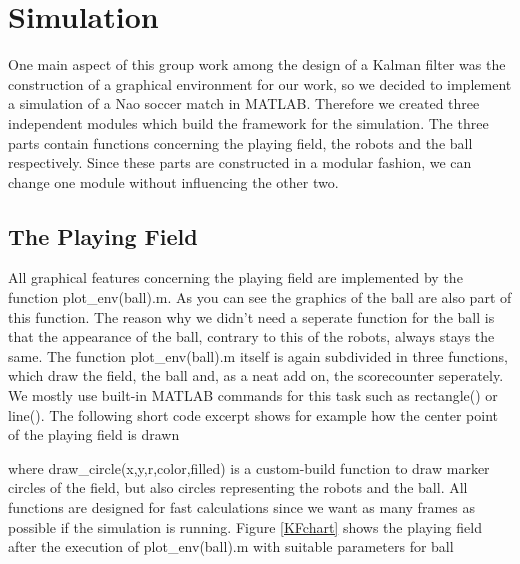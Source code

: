 
\chapter{Simulation}

One main aspect of this group work among the design of a Kalman filter was the construction of a graphical environment for our work, so we decided to implement a simulation of a Nao soccer match in MATLAB. Therefore we created three independent modules which build the framework for the simulation. The three parts contain functions concerning the playing field, the robots and the ball respectively. Since these parts are constructed in a modular fashion, we can change one module without influencing the other two.


\section{The Playing Field}

All graphical features concerning the playing field are implemented by the function {\selectfont plot\_env(ball).m}. As you can see the graphics of the ball are also part of this function. The reason why we didn't need a seperate function for the ball is that the appearance of the ball, contrary to this of the robots, always stays the same. The function {\selectfont plot\_env(ball).m} itself is again subdivided in three functions, which draw the field, the ball and, as a neat add on, the scorecounter seperately. We mostly use built-in MATLAB commands for this task such as {\selectfont rectangle()} or {\selectfont line()}. The following short code excerpt shows for example how the center point of the playing field is drawn


\parskip 20pt

where {\selectfont draw\_circle(x,y,r,color,filled)} is a custom-build function to draw marker circles of the field, but also circles representing the robots and the ball. All functions are designed for fast calculations since we want as many frames as possible if the simulation is running. Figure \ref{KFchart} shows the playing field after the execution of {\selectfont plot\_env(ball).m} with suitable parameters for {\selectfont ball}
\parskip 10pt

